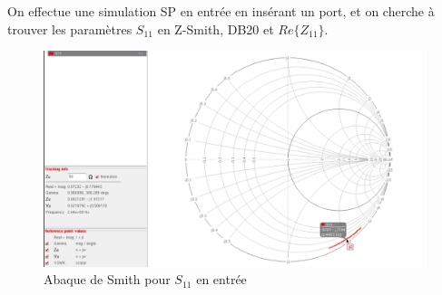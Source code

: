 \documentclass[a4paper]{article}
\begin{document}
On effectue une simulation SP en entr\'ee en ins\'erant un port, et on cherche \`a trouver les
param\`etres $S_{11}$ en Z-Smith, DB20 et $Re\{Z_{11}\}$.

\begin{figure}[!htb]
\begin{center}
  \includegraphics[width=\linewidth]{Q2-S11-Smith-notadapted.png}
  \caption{Abaque de Smith pour $S_{11}$ en entr\'ee }
  \label{S11-nonadapted}
\end{center}
\end{figure}

\clearpage
\end{document}
